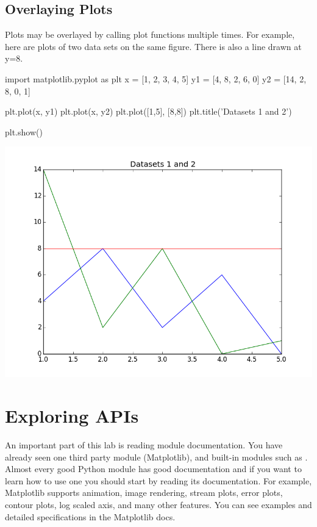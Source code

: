\documentclass[11pt]{cselabheader}
\begin{document}
\subsection{Overlaying Plots}
Plots may be overlayed by calling plot functions multiple times.
For example, here are plots of two data sets on the same figure.
There is also a line drawn at y=8.

\begin{python3code}
import matplotlib.pyplot as plt
x = [1, 2, 3, 4, 5]
y1 = [4, 8, 2, 6, 0]
y2 = [14, 2, 8, 0, 1]

plt.plot(x, y1)
plt.plot(x, y2)
plt.plot([1,5], [8,8])
plt.title('Datasets 1 and 2')

plt.show()
\end{python3code}

\begin{center}
\includegraphics[width=\textwidth]{img/matplotlib_overlayed.png}
\end{center}

\section{Exploring APIs}
An important part of this lab is reading module documentation. You
have already seen one third party module (Matplotlib), and
built-in modules such as . Almost every good Python
module has good documentation and if you want to learn how to use one
you should start by reading its documentation.  For example, Matplotlib
supports animation, image rendering, stream plots, error plots,
contour plots, log scaled axis, and many other features. You can see
examples and detailed specifications in the Matplotlib docs.
\end{document}
